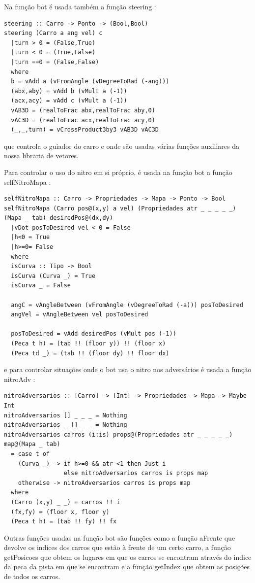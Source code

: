 \documentclass[a4paper]{report} %
\begin{document}
Na função bot é usada também a função steering : 

\begin{verbatim}
steering :: Carro -> Ponto -> (Bool,Bool)
steering (Carro a ang vel) c
  |turn > 0 = (False,True)
  |turn < 0 = (True,False)
  |turn ==0 = (False,False)
  where
  b = vAdd a (vFromAngle (vDegreeToRad (-ang)))
  (abx,aby) = vAdd b (vMult a (-1))
  (acx,acy) = vAdd c (vMult a (-1))
  vAB3D = (realToFrac abx,realToFrac aby,0)
  vAC3D = (realToFrac acx,realToFrac acy,0)
  (_,_,turn) = vCrossProduct3by3 vAB3D vAC3D
\end{verbatim}
que controla o guiador do carro e onde são usadas várias funções auxiliares da nossa libraria de vetores.

Para controlar o uso do nitro em si próprio, é usada na função bot a função selfNitroMapa :

\begin{verbatim}
selfNitroMapa :: Carro -> Propriedades -> Mapa -> Ponto -> Bool
selfNitroMapa (Carro pos@(x,y) a vel) (Propriedades atr _ _ _ _ _) (Mapa _ tab) desiredPos@(dx,dy)
  |vDot posToDesired vel < 0 = False
  |h<0 = True
  |h>=0= False
  where
  isCurva :: Tipo -> Bool
  isCurva (Curva _) = True
  isCurva _ = False

  angC = vAngleBetween (vFromAngle (vDegreeToRad (-a))) posToDesired
  angVel = vAngleBetween vel posToDesired

  posToDesired = vAdd desiredPos (vMult pos (-1)) 
  (Peca t h) = (tab !! (floor y)) !! (floor x)
  (Peca td _) = (tab !! (floor dy) !! floor dx)
\end{verbatim}
e para controlar situações onde o bot usa o nitro nos adversários é usada a função nitroAdv :

\begin{verbatim}
nitroAdversarios :: [Carro] -> [Int] -> Propriedades -> Mapa -> Maybe Int
nitroAdversarios [] _ _ _ = Nothing
nitroAdversarios _ [] _ _ = Nothing
nitroAdversarios carros (i:is) props@(Propriedades atr _ _ _ _ _) map@(Mapa _ tab)
  = case t of
    (Curva _) -> if h>=0 && atr <1 then Just i
                 else nitroAdversarios carros is props map
    otherwise -> nitroAdversarios carros is props map
  where
  (Carro (x,y) _ _) = carros !! i
  (fx,fy) = (floor x, floor y)
  (Peca t h) = (tab !! fy) !! fx
\end{verbatim}

Outras funções usadas na função bot são funções como a função aFrente que devolve os indices dos carros que estão à frente de um certo carro, a função getPosicoes que obtem os lugares em que os carros se encontram através do indice da peca da pista em que se encontram e a função getIndex que obtem as posições de todos os carros.
\end{document}
